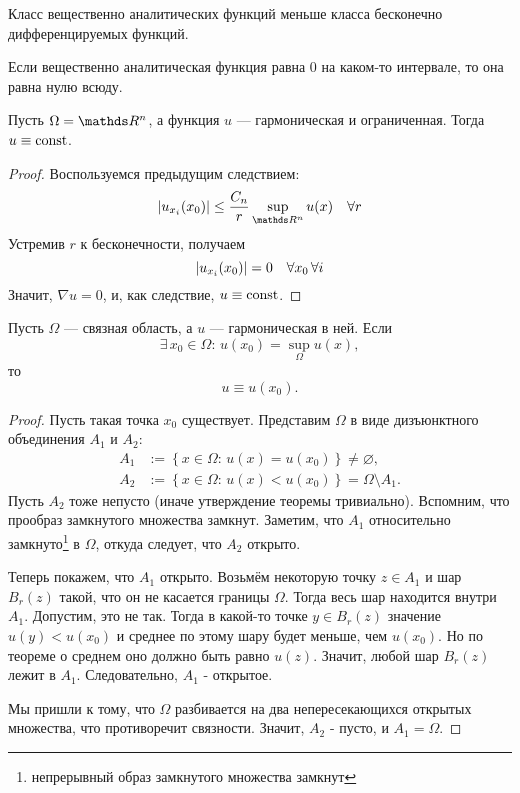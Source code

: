 \begin{note}
Класс вещественно аналитических функций меньше класса бесконечно дифференцируемых функций.
\end{note}

\begin{note}
Если вещественно аналитическая функция равна 0 на каком-то интервале, то она равна нулю всюду.
\end{note}

\begin{corollary}
Пусть $\Omega = \real^n$, а функция $u$ --- гармоническая и ограниченная. Тогда $u \equiv \operatorname{const}$.
\end{corollary}
\begin{proof}
Воспользуемся предыдущим следствием:
$$ \abs{u_{x_i} (x_0)} \leq \frac {C_n} {r} \sup_{\real^n} u(x) \quad \forall r$$
Устремив $r$ к бесконечности, получаем
$$ \lvert u_{x_i} (x_0)\rvert = 0 \quad \forall x_0 \, \forall i$$
Значит, $\nabla u = 0$, и, как следствие, $u \equiv \operatorname{const}$.

\end{proof}

\begin{theorem}
Пусть $\Omega$ --- связная область, а $u$ --- гармоническая в ней. Если
$$ \exists \, x_0 \in \Omega: \, u(x_0) = \sup_\Omega u(x),$$
 то $$u \equiv u(x_0).$$
\end{theorem}
\begin{proof}
Пусть такая точка $x_0$ существует. Представим $\Omega$ в виде дизъюнктного объединения $A_1$ и $A_2$:
\begin{align*}
	A_1 &:= \left\{ x \in \Omega: \, u(x) = u(x_0) \right\} \neq \varnothing, \\
	A_2 &:= \left\{ x \in \Omega: \, u(x) < u(x_0) \right\} = \Omega \setminus A_1.
\end{align*}
Пусть $A_2$ тоже непусто (иначе утверждение теоремы тривиально). Вспомним, что прообраз замкнутого множества замкнут. Заметим, что $A_1$ относительно замкнуто\footnote{ непрерывный образ замкнутого множества замкнут} в $\Omega$, откуда следует, что $A_2$ открыто.

Теперь покажем, что $A_1$ открыто. Возьмём некоторую точку $z \in A_1$ и шар $B_r (z)$ такой, что он не касается границы $\Omega$. Тогда весь шар находится внутри $A_1$. Допустим, это не так. Тогда в какой-то точке $y \in B_r (z) $ значение $u(y) < u(x_0)$ и среднее по этому шару будет меньше, чем $u(x_0)$. Но по теореме о среднем оно должно быть равно $u(z)$. Значит, любой шар $B_r (z)$ лежит в $A_1$. Следовательно, $A_1$ - открытое.

Мы пришли к тому, что $\Omega$ разбивается на два непересекающихся открытых множества, что противоречит связности. Значит, $A_2$ - пусто, и $A_1 = \Omega$.

\end{proof}

